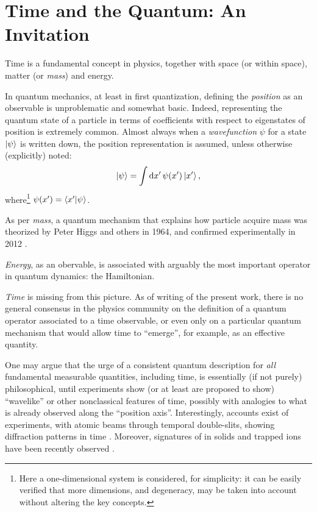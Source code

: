 \section{Time and the Quantum: An Invitation}\label{sec:intro}

Time is a fundamental concept in physics, together with space (or  within space),
matter (or \emph{mass}) and energy.

In quantum mechanics, at least in first quantization, defining the \emph{position} as
an observable is unproblematic and somewhat basic.
Indeed, representing the quantum state of a particle
in terms of coefficients with respect to eigenstates of position is extremely common.
Almost always when a \emph{wavefunction} $\psi$
for a state $\ket{\psi}$
is written down, the {position representation}
is assumed, unless otherwise (explicitly) noted:
\begin{equation}\label{eq:positionrepr}
  \ket{\psi} = \int \dd{x'} \psi(x') \ket{x'} \text{,}
\end{equation}
where\footnote{
  Here a one-dimensional system is considered, for simplicity:
  it can be easily verified that more dimensions,
  and degeneracy, may be taken into account without altering the key concepts.
}
$\psi(x') = \braket{x'}{\psi}$.

As per \emph{mass}, a quantum mechanism that explains how particle acquire mass was theorized by
Peter Higgs and others in 1964, and confirmed experimentally in 2012
\parencite{Higgs, EnglertBrout, Kibble+, HiggsATLAS, HiggsCMS}.

\emph{Energy}, as an obervable, is associated with arguably the most important operator in quantum dynamics: the Hamiltonian.

\emph{Time} is missing from this picture. As of writing of the present work,
there is no general consensus in the physics community on
the definition of a quantum operator associated to a time observable,
or even only on a particular quantum mechanism that would allow time to ``emerge'',
for example, as an effective quantity.

One may argue that the urge of a consistent quantum description for \emph{all} fundamental
measurable quantities, including time,
is essentially (if not purely)
philosophical,
until experiments show (or at least are proposed to show)
``wavelike'' or other nonclassical features of time,
possibly with analogies to what is already observed along the ``position axis''.
Interestingly, accounts exist of experiments, with atomic beams through temporal double-slits,
showing diffraction patterns in time \parencite{TemporalSlits}.
Moreover, signatures of 
in solids and trapped ions have been recently observed
\parencite{crystal.exp.ordered, crystal.exp.disordered, crystal.exp.nmr, crystal.exp}.

